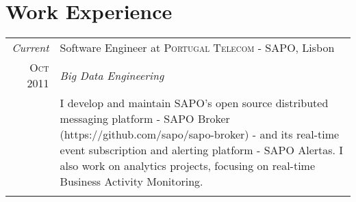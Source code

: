 \documentclass[a4paper,10pt]{article}
\begin{document}
  \section{Work Experience}
  \begin{tabular}{r|p{11cm}}
    \emph{Current}    & Software Engineer at \textsc{Portugal Telecom - SAPO}, Lisbon                 \\
    \textsc{Oct 2011} & \emph{Big Data Engineering}                                                   \\
                      & \footnotesize{I develop and maintain SAPO's open source
                                      distributed messaging platform - SAPO Broker
                                      (https://github.com/sapo/sapo-broker) - and its real-time event
                                      subscription and alerting platform - SAPO Alertas.
                                      I also work on analytics projects, focusing on real-time
                                      Business Activity Monitoring.}                                  \\
    \multicolumn{2}{c}{}                                                                              \\


\end{tabular}
\end{document}
